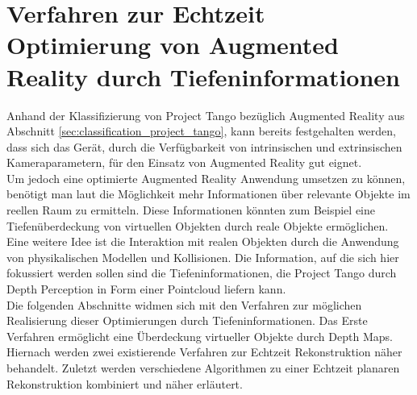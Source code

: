 \chapter{Verfahren zur Echtzeit Optimierung von Augmented Reality durch Tiefeninformationen}

Anhand der Klassifizierung von Project Tango bezüglich Augmented Reality aus Abschnitt \ref{sec:classification_project_tango}, kann bereits festgehalten werden, dass sich das Gerät, durch die Verfügbarkeit von intrinsischen und extrinsischen Kameraparametern, für den Einsatz von Augmented Reality gut eignet. \\ 

Um jedoch eine optimierte Augmented Reality Anwendung umsetzen zu können, benötigt man laut \citet{azuma2001recent} die Möglichkeit mehr Informationen über relevante Objekte im reellen Raum zu ermitteln. Diese Informationen könnten zum Beispiel eine Tiefenüberdeckung von virtuellen Objekten durch reale Objekte ermöglichen. Eine weitere Idee ist die Interaktion mit realen Objekten durch die Anwendung von physikalischen Modellen und Kollisionen. Die Information, auf die sich hier fokussiert werden sollen sind die Tiefeninformationen, die Project Tango durch Depth Perception in Form einer Pointcloud liefern kann.\\

Die folgenden Abschnitte widmen sich mit den Verfahren zur möglichen Realisierung dieser Optimierungen durch Tiefeninformationen. Das Erste Verfahren ermöglicht eine Überdeckung virtueller Objekte durch Depth Maps. Hiernach werden zwei existierende Verfahren zur Echtzeit Rekonstruktion näher behandelt. Zuletzt werden verschiedene Algorithmen zu einer Echtzeit planaren Rekonstruktion kombiniert und näher erläutert. \\






